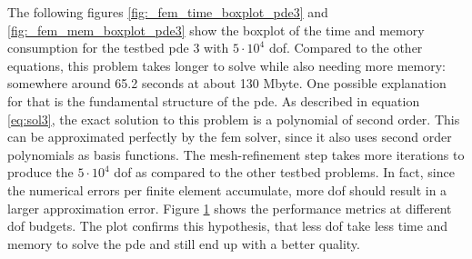 \documentclass[./\jobname.tex]{subfiles}
\begin{document}
The following figures \ref{fig:_fem_time_boxplot_pde3} and \ref{fig:_fem_mem_boxplot_pde3} show the boxplot of the time and memory consumption for the testbed \gls{pde} 3 with $5 \cdot 10^4$ \gls{dof}. Compared to the other equations, this problem takes longer to solve while also needing more memory: somewhere around 65.2 seconds at about 130 Mbyte. One possible explanation for that is the fundamental structure of the \gls{pde}. As described in equation \eqref{eq:sol3}, the exact solution to this problem is a polynomial of second order. This can be approximated perfectly by the \gls{fem} solver, since it also uses second order polynomials as basis functions. The mesh-refinement step takes more iterations to produce the $5 \cdot 10^4$ \gls{dof} as compared to the other testbed problems. In fact, since the numerical errors per finite element accumulate, more \gls{dof} should result in a larger approximation error. Figure \ref{fig:_dof_sweep_pde3} shows the performance metrics at different \gls{dof} budgets. The plot confirms this hypothesis, that less \gls{dof} take less time and memory to solve the \gls{pde} and still end up with a better quality. 

\begin{figure}[H]
	\centering
	\noindent{}
	\label{fig:_dof_sweep_pde3}
\end{figure}
\end{document}
